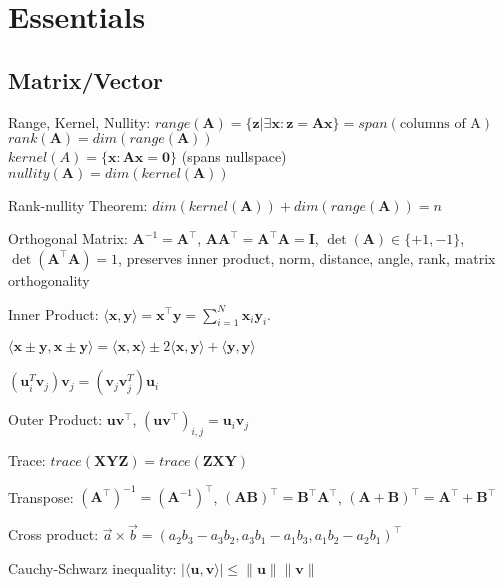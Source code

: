 \section{Essentials}
\subsection*{Matrix/Vector}
\begin{compactdesc}
    \item[Range, Kernel, Nullity:]
    $\mathit{range}(\mathbf{A}) = \{\textbf{z} | \exists \textbf{x}: \textbf{z}=\textbf{Ax}\} = \mathit{span}(\text{columns of A})$ \\
    $\mathit{rank}(\mathbf{A}) = \mathit{dim}(\mathit{range}(\mathbf{A}))$ \\
    $\mathit{kernel}(A) = \{\mathbf{x}: \mathbf{Ax}=\mathbf{0}\}$ (spans nullspace)\\
    $\mathit{nullity}(\mathbf{A}) = \mathit{dim}(\mathit{kernel}(\mathbf{A}))$
    \item[Rank-nullity Theorem:]
    $\textit{dim}(\textit{kernel}(\textbf{A}))+\textit{dim}(\textit{range}(\textbf{A})) = n$
    
	\item[Orthogonal Matrix:] $\mathbf{A}^{-1} = \mathbf{A}^\top$, $\mathbf{A} \mathbf{A}^\top = \mathbf{A}^\top \mathbf{A} = \mathbf{I}$, $\operatorname{det}(\mathbf{A}) \in \{+1, -1\}$, $\operatorname{det}(\mathbf{A}^\top \mathbf{A}) = 1$,
	preserves inner product, norm, distance, angle, rank, matrix orthogonality 
	
	\item[Inner Product:] $\langle \mathbf{x}, \mathbf{y} \rangle = \mathbf{x}^\top \mathbf{y} = \sum_{i=1}^{N} \mathbf{x}_i \mathbf{y}_i$.
	\begin{inparaitem}
		\item $\langle \mathbf{x} \pm \mathbf{y}, \mathbf{x} \pm \mathbf{y} \rangle = \langle \mathbf{x}, \mathbf{x} \rangle \pm 2 \langle \mathbf{x}, \mathbf{y} \rangle + \langle \mathbf{y}, \mathbf{y} \rangle$
		\item $(\mathbf{u}_i^T\mathbf{v}_j)\mathbf{v}_j = (\mathbf{v}_j\mathbf{v}_j^T)\mathbf{u}_i$
	\end{inparaitem}
	\item[Outer Product:] $\mathbf{u} \mathbf{v}^\top$, $(\mathbf{u} \mathbf{v}^\top)_{i, j} = \mathbf{u}_i \mathbf{v}_j$
    \item[Trace:] $\mathit{trace}(\mathbf{XYZ})=\mathit{trace}(\mathbf{ZXY})$
	\item[Transpose:] $(\mathbf{A}^\top)^{-1} = (\mathbf{A}^{-1})^\top$,  $(\mathbf{A}\mathbf{B})^\top= \mathbf{B}^\top\mathbf{A}^\top$, $(\mathbf{A}+\mathbf{B})^\top= \mathbf{A}^\top + \mathbf{B}^\top$
	\item[Cross product:] $\vec{a}\times\vec{b}=(a_2b_3-a_3b_2, a_3b_1-a_1b_3, a_1b_2-a_2b_1)^\top$
	\item[Cauchy-Schwarz inequality:] $|\langle\mathbf{u}, \mathbf{v}\rangle| \leq \|\mathbf{u}\|\|\mathbf{v}\|$
\end{compactdesc}

